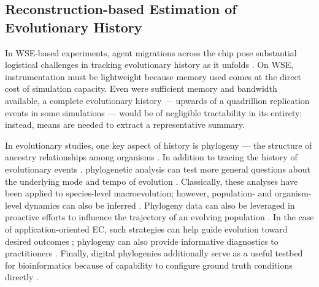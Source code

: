 \vspace{-4.0ex}
\subsection{Reconstruction-based Estimation of Evolutionary History}
\label{moreno:sec:case2:hstrat}
\vspace{-2.0ex}

In WSE-based experiments, agent migrations across the chip pose substantial logistical challenges in tracking evolutionary history as it unfolds \cite{moreno2024analysis}.
On WSE, instrumentation must be lightweight because memory used comes at the direct cost of simulation capacity.
Even were sufficient memory and bandwidth available, a complete evolutionary history --- upwards of a quadrillion replication events in some simulations \cite{singhvi2025scalable} --- would be of negligible tractability in its entirety; instead, means are needed to extract a representative summary.

In evolutionary studies, one key aspect of history is phylogeny --- the structure of ancestry relationships among organisms \cite{faithConservationEvaluationPhylogenetic1992, STAMATAKIS2005phylogenetics,frenchHostPhylogenyShapes2023,kim2006discovery,lenski2003evolutionary}.
In addition to tracing the history of evolutionary events \cite{dawkins2016ancestor,hedges2015tree,hinchliff2015synthesis}, phylogenetic analysis can test more general questions about the underlying mode and tempo of evolution \cite{felsenstein1985phylogenies}.
Classically, these analyses have been applied to species-level macroevolution; however, population- and organism-level dynamics can also be inferred \cite{genthon2023cell, levy2015quantitative,stadler2013recovering,Moreno2025ecology,lewinsohnStatedependentEvolutionaryModels2023a,nozoe2017inferring}.
Phylogeny data can also be leveraged in proactive efforts to influence the trajectory of an evolving population \cite{Scott2018}.
In the case of application-oriented EC, such strategies can help guide evolution toward desired outcomes \cite{lalejini2024phylogeny,lalejini2024runtime,murphy2008simple,burke2003increased,gabor2018inheritancebased,gabor2018preparing}; phylogeny can also provide informative diagnostics to practitioners \cite{hernandez2022can,shahbandegan2022untangling}.
Finally, digital phylogenies additionally serve as a useful testbed for bioinformatics because of capability to configure ground truth conditions directly \cite{daudey2024aevol,haller2023slim,moreno2025extending}.

